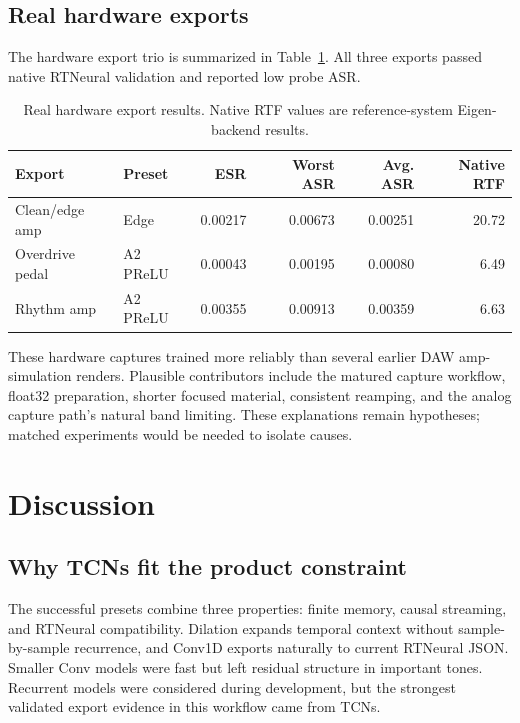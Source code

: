 \documentclass[11pt]{article}
\begin{document}
\subsection{Real hardware exports}

The hardware export trio is summarized in Table~\ref{tab:hardware}. All three
exports passed native RTNeural validation and reported low probe ASR.

\begin{table}[t]
\centering
\small
\begin{tabular}{@{}llrrrr@{}}
\toprule
Export & Preset & ESR & Worst ASR & Avg. ASR & Native RTF \\
\midrule
Clean/edge amp & Edge & 0.00217 & 0.00673 & 0.00251 & 20.72 \\
Overdrive pedal & A2 PReLU & 0.00043 & 0.00195 & 0.00080 & 6.49 \\
Rhythm amp & A2 PReLU & 0.00355 & 0.00913 & 0.00359 & 6.63 \\
\bottomrule
\end{tabular}
\caption{Real hardware export results. Native RTF values are reference-system
Eigen-backend results.}
\label{tab:hardware}
\end{table}

These hardware captures trained more reliably than several earlier DAW
amp-simulation renders. Plausible contributors include the matured capture
workflow, float32 preparation, shorter focused material, consistent reamping,
and the analog capture path's natural band limiting. These explanations remain
hypotheses; matched experiments would be needed to isolate causes.

\section{Discussion}

\subsection{Why TCNs fit the product constraint}

The successful presets combine three properties: finite memory, causal
streaming, and RTNeural compatibility. Dilation expands temporal context
without sample-by-sample recurrence, and Conv1D exports naturally to current
RTNeural JSON. Smaller Conv models were fast but left residual structure in
important tones. Recurrent models were considered during development, but the
strongest validated export evidence in this workflow came from TCNs.
\end{document}

